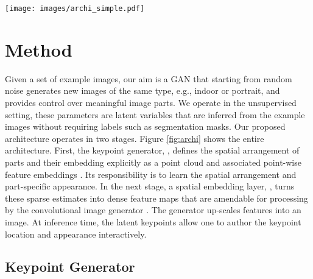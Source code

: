 \documentclass[10pt, conference, compsocconf]{IEEEtran}
\begin{document}
\begin{figure*}
\begin{center}
\texttt{[image: images/archi\_simple.pdf]}
\end{center}
   \caption{\textbf{Overview.} Starting from noise , LatentKeypointGAN generates keypoint coordinates,  and their embeddings . Cruicial is how they are turned into feature maps that are localized around the keypoints, forming conditional maps for the image generation via SPADE block at different resolutions. At inference time, the position and embedding of keypoints can be edited by the user to control the position and appearance of parts.
}
\label{fig:archi}
\end{figure*}















\section{Method}

Given a set of example images, our aim is a GAN that starting from random noise generates new images of the same type, e.g., indoor or portrait, and provides control over meaningful image parts.
We operate in the unsupervised setting, these parameters are latent variables that are inferred from the example images without requiring labels such as segmentation masks. 
Our proposed architecture operates in two stages. Figure \ref{fig:archi} shows the entire architecture.
First, the keypoint generator, , defines the spatial arrangement of parts and their embedding explicitly as a point cloud  and associated point-wise feature embeddings . Its responsibility is to learn the spatial arrangement and part-specific appearance.
In the next stage, a spatial embedding layer, , turns these sparse estimates into dense feature maps that are amendable for processing by the convolutional image generator . The generator up-scales features into an image. 
At inference time, the latent keypoints allow one to author the keypoint location and appearance interactively.

\subsection{Keypoint Generator}
\label{sec: keypoint generator}
\end{document}
